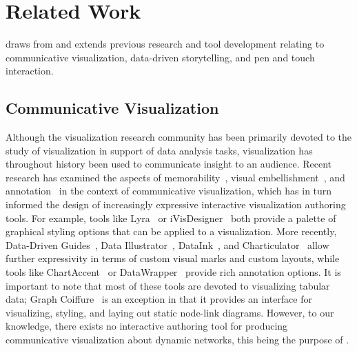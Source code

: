 \section{Related Work}
\label{sec:related_work}



\toolname{} draws from and extends previous research and tool development relating to communicative visualization, data-driven storytelling, and pen and touch interaction. 


\subsection{Communicative Visualization}

Although the visualization research community has been primarily devoted to the study of visualization in support of data analysis tasks, visualization has throughout history been used to communicate insight to an audience. 
Recent research has examined the aspects of memorability~\cite{borkin2013makes,borkin2016beyond}, visual embellishment~\cite{bateman2010useful}, and annotation~\cite{ren2017chartaccent} in the context of communicative visualization, which has in turn informed the design of increasingly expressive interactive visualization authoring tools.
For example, tools like Lyra~\cite{satyanarayan2014lyra} or iVisDesigner~\cite{ren2014ivisdesigner} both provide a palette of graphical styling options that can be applied to a visualization. 
More recently, Data-Driven Guides~\cite{kim2017data}, Data Illustrator~\cite{liu2018data}, DataInk~\cite{xia2018dataink}, and Charticulator~\cite{ren2018chart} allow further expressivity in terms of custom visual marks and custom layouts, while tools like ChartAccent~\cite{ren2017chartaccent} or DataWrapper~\cite{datawrapper} provide rich annotation options. 
It is important to note that most of these tools are devoted to visualizing tabular data;
Graph Coiffure~\cite{spritzer2015towards} is an exception in that it provides an interface for visualizing, styling, and laying out static node-link diagrams.
However, to our knowledge, there exists no interactive authoring tool for producing communicative visualization about dynamic networks, this being the purpose of \toolname{}.







